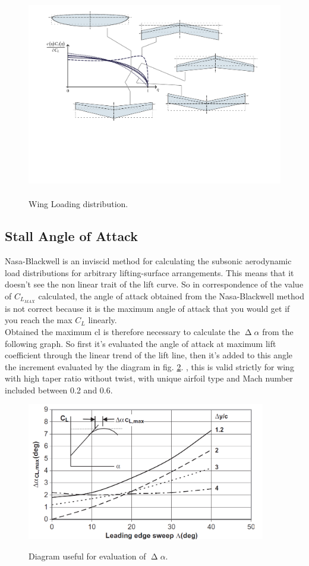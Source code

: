 \begin{figure}[H]
\centering
{\includegraphics[height=8.3cm]{Immagini/wing_loading_B}} 
\caption{Wing Loading distribution.}
\label{fig:wl}
\end{figure}

\subsection{Stall Angle of Attack}

Nasa-Blackwell is an inviscid method for calculating the subsonic aerodynamic load distributions for arbitrary lifting-surface arrangements. This means that it doesn't see the non linear trait of the lift curve. So in correspondence of the value of $C_{L_{MAX}}$ calculated, the angle of attack obtained from the Nasa-Blackwell method is not correct because it is the maximum angle of attack that you would get if you reach the max $C_L$ linearly.\\
Obtained the maximum cl is therefore necessary to calculate the $\upDelta \alpha$ from the following graph. So first it’s evaluated the angle of attack at maximum lift coefficient through the linear trend of the lift line, then it’s added to this angle the increment evaluated by the diagram in fig. \ref{fig:dealpha}. , this is valid strictly for wing with high taper ratio without twist, with unique airfoil type and Mach number included between 0.2 and 0.6.


\begin{figure}[H]
\centering
{\includegraphics[height=6cm]{Immagini/deltaAlphaSforza.png}} 
\caption{Diagram useful for evaluation of $\upDelta \alpha$.}
\label{fig:dealpha}
\end{figure}



